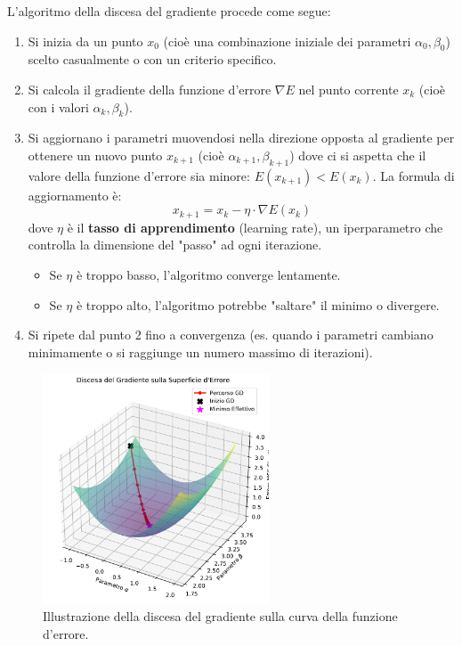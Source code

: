 \documentclass{article}
\begin{document}
L'algoritmo della discesa del gradiente procede come segue:
\begin{enumerate}
    \item Si inizia da un punto $x_0$ (cioè una combinazione iniziale dei parametri $\alpha_0, \beta_0$) scelto casualmente o con un criterio specifico.
    \item Si calcola il gradiente della funzione d'errore $\nabla E$ nel punto corrente $x_k$ (cioè con i valori $\alpha_k, \beta_k$).
    \item Si aggiornano i parametri muovendosi nella direzione opposta al gradiente per ottenere un nuovo punto $x_{k+1}$ (cioè $\alpha_{k+1}, \beta_{k+1}$) dove ci si aspetta che il valore della funzione d'errore sia minore: $E(x_{k+1}) < E(x_k)$. La formula di aggiornamento è:
          $$ x_{k+1} = x_k - \eta \cdot \nabla E(x_k) $$
          dove $\eta$ è il \textbf{tasso di apprendimento} (learning rate), un iperparametro che controlla la dimensione del "passo" ad ogni iterazione.
          \begin{itemize}
              \item Se $\eta$ è troppo basso, l'algoritmo converge lentamente.
              \item Se $\eta$ è troppo alto, l'algoritmo potrebbe "saltare" il minimo o divergere.
          \end{itemize}
    \item Si ripete dal punto 2 fino a convergenza (es. quando i parametri cambiano minimamente o si raggiunge un numero massimo di iterazioni).
\end{enumerate}

\begin{figure}[H]
    \centering
    \includegraphics[width=0.6\textwidth]{images/gradient_descent_steps.pdf}
    \caption{Illustrazione della discesa del gradiente sulla curva della funzione d'errore.}
    \label{fig:gradient_descent_steps}
\end{figure}
\end{document}
